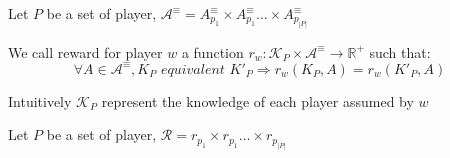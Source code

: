 \begin{mydef}
	Let $P$ be a set of player, $\mathcal{A}^\equiv = A_{p_1}^\equiv \times A_{p_1}^\equiv \ldots \times A_{p_{|P|}}^\equiv$
\end{mydef}

\begin{mydef}
	We call reward for player $w$ a function $r_w : \mathcal{K}_P \times \mathcal{A}^\equiv \rightarrow \mathbb{R}^+$ 
	such that: $$ \forall A \in \mathcal{A}^\equiv, K_P \textit{ equivalent } K'_P \Rightarrow r_w(K_P,A) = r_w(K'_P,A) $$
\end{mydef}
Intuitively $\mathcal{K}_P$ represent the knowledge of each player assumed by $w$

\begin{mydef}
	Let $P$ be a set of player, $\mathcal{R} = r_{p_1} \times r_{p_1} \ldots \times r_{p_{|P|}}$
\end{mydef}
